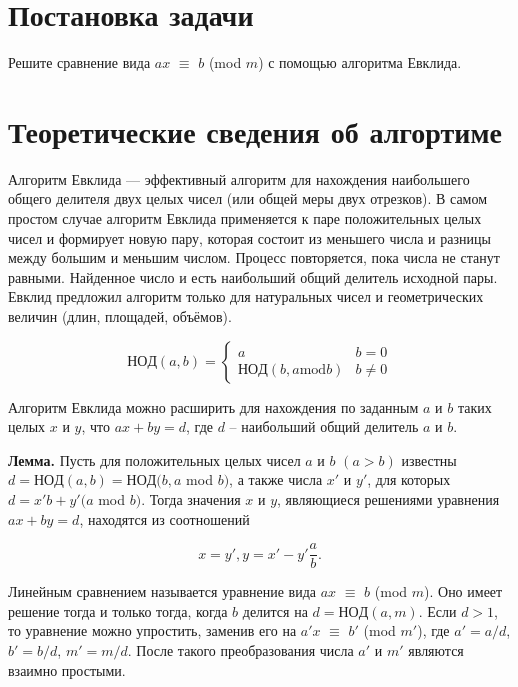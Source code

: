 \documentclass[spec, och, labwork]{shiza}
\begin{document}
\tableofcontents

\section{Постановка задачи}

Решите сравнение вида $ax$ $\equiv$ $b$ (mod $m$)  с помощью алгоритма Евклида.

\section{Теоретические сведения об алгортиме}
Алгоритм Евклида — эффективный алгоритм для нахождения наибольшего общего 
делителя двух целых чисел (или общей меры двух отрезков). В самом простом
случае алгоритм Евклида применяется к паре положительных целых чисел и 
формирует новую пару, которая состоит из меньшего числа и разницы между 
большим и меньшим числом. Процесс повторяется, пока числа не станут равными.
Найденное число и есть наибольший общий делитель исходной пары. 
Евклид предложил алгоритм только для натуральных чисел и геометрических 
величин (длин, площадей, объёмов).

\begin{equation*}
    НОД(a, b) = 
    \begin{cases}
        a &\text {$b = 0$} \\
        НОД(b, a \text{mod} b) &\text {$b \neq 0$}
    \end{cases}
\end{equation*}

Алгоритм Евклида можно расширить для нахождения по заданным $a$ и $b$ таких 
целых $x$ и $y$, что $ax + by = d$, где $d$ – наибольший общий делитель $a$
и $b$.

\textbf{Лемма.} Пусть для положительных целых чисел $a$ и $b$ $(a > b)$ 
известны $d = НОД(a, b) = НОД(b, a$ mod $b)$, а также числа $x'$ и $y'$, 
для которых $d = x'b + y'(a$ mod $b)$. Тогда значения $x$ и $y$, являющиеся
решениями уравнения $ax + by = d$, находятся из соотношений

\begin{equation*}
    x = y', y = x' - y' \frac{a}{b}.
\end{equation*}

Линейным сравнением называется уравнение вида $ax$ $\equiv$ $b$ (mod $m$).
Оно имеет решение тогда и только тогда, когда $b$ делится на $d = НОД(a, m)$.
Если $d > 1$, то уравнение можно упростить, заменив его на $a'x$ $\equiv$ $b'$
(mod $m'$), где $a' = a / d$, $b' = b / d$, $m' = m / d$. После такого
преобразования числа $a'$ и $m'$ являются взаимно простыми.
\end{document}

